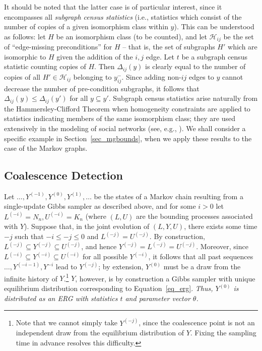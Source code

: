 \documentclass[11pt]{article}
\begin{document}
It should be noted that the latter case is of particular interest, since it encompasses all \emph{subgraph census statistics} (i.e., statistics which consist of the number of copies of a given isomorphism class within $y$).  This can be understood as follows: let $H$ be an isomorphism class (to be counted), and let $\mathcal{H}_{ij}$ be the set of ``edge-missing preconditions'' for $H$ -- that is, the set of subgraphs $H'$ which are isomorphic to $H$ given the addition of the $i,j$ edge.  Let $t$ be a subgraph census statistic counting copies of $H$.  Then $\Delta_{ij}(y)$ is clearly equal to the number of copies of all $H' \in \mathcal{H}_{ij}$ belonging to $y^-_{ij}$.  Since adding non-$ij$ edges to $y$ cannot decrease the number of pre-condition subgraphs, it follows that $\Delta_{ij}(y)\le\Delta_{ij}(y')$ for all $y \subseteq y'$.  Subgraph census statistics arise naturally from the Hammersley-Clifford Theorem \citep{besag:jrssB:1974} when homogeneity constraints are applied to statistics indicating members of the same isomorphism class; they are used extensively in the modeling of social networks (see, e.g., \citet{holland.leinhardt:jasa:1981,frank.strauss:jasa:1986,wasserman.pattison:p:1996,pattison.wasserman:bjmsp:1999,pattison.robins:sm:2002}).  We shall consider a specific example in Section~\ref{sec_mgbounds}, when we apply these results to the case of the Markov graphs.

\subsection{Coalescence Detection}

Let $\ldots,Y^{(-1)},Y^{(0)},Y^{(1)},\ldots$ be the states of a Markov chain resulting from a single-update Gibbs sampler as described above, and for some $i>0$ let $L^{(-i)}=N_n, U^{(-i)}=K_n$ (where $(L,U)$ are the bounding processes associated with $Y$).  Suppose that, in the joint evolution of $(L,Y,U)$, there exists some time $-j$ such that $-i\le -j \le 0$ and $L^{(-j)}=U^{(-j)}$.  By construction, $L^{(-j)} \subseteq Y^{(-j)} \subseteq U^{(-j)}$, and hence $Y^{(-j)}=L^{(-j)}=U^{(-j)}$.  Moreover, since $L^{(-i)} \subseteq Y^{(-i)} \subseteq U^{(-i)}$ for all possible $Y^{(-i)}$, it follows that all past sequences $\ldots,Y^{(-i-1)},Y^{-i}$ lead to $Y^{(-j)}$; by extension, $Y^{(0)}$ must be a draw from the infinite history of $Y$.\footnote{Note that we cannot simply take $Y^{(-j)}$, since the coalescence point is not an independent draw from the equilibrium distribution of $Y$.  Fixing the sampling time in advance resolves this difficulty.}  $Y$, however, is by construction a Gibbs sampler with unique equilibrium distribution corresponding to Equation~\ref{eq_erg}.  \emph{Thus, $Y^{(0)}$ is distributed as an ERG with statistics $t$ and parameter vector $\theta$.}
\end{document}
